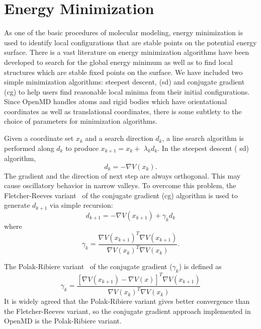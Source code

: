 \documentclass[]{book}
\begin{document}
\chapter{\label{section:minimizer}Energy Minimization}

As one of the basic procedures of molecular modeling, energy
minimization is used to identify local configurations that are stable
points on the potential energy surface. There is a vast literature on
energy minimization algorithms have been developed to search for the
global energy minimum as well as to find local structures which are
stable fixed points on the surface.  We have included two simple
minimization algorithms: steepest descent, ({\sc sd}) and conjugate
gradient ({\sc cg}) to help users find reasonable local minima from
their initial configurations. Since {\sc OpenMD} handles atoms and
rigid bodies which have orientational coordinates as well as
translational coordinates, there is some subtlety to the choice of
parameters for minimization algorithms.

Given a coordinate set $x_{k}$ and a search direction $d_{k}$, a line
search algorithm is performed along $d_{k}$ to produce
$x_{k+1}=x_{k}+$ $\lambda _{k}d_{k}$. In the steepest descent ({\sc
sd}) algorithm,%
\begin{equation}
d_{k}=-\nabla V(x_{k}).
\end{equation}
The gradient and the direction of next step are always orthogonal.
This may cause oscillatory behavior in narrow valleys.  To overcome
this problem, the Fletcher-Reeves variant~\cite{FletcherReeves} of the
conjugate gradient ({\sc cg}) algorithm is used to generate $d_{k+1}$
via simple recursion:
\begin{equation}
d_{k+1}  =-\nabla V(x_{k+1})+\gamma_{k}d_{k}
\end{equation}
where
\begin{equation}
\gamma_{k}  =\frac{\nabla V(x_{k+1})^{T}\nabla V(x_{k+1})}{\nabla
V(x_{k})^{T}\nabla V(x_{k})}.
\end{equation}

The Polak-Ribiere variant~\cite{PolakRibiere} of the conjugate
gradient ($\gamma_{k}$) is defined as%
\begin{equation}
\gamma_{k}=\frac{[\nabla V(x_{k+1})-\nabla V(x)]^{T}\nabla V(x_{k+1})}{\nabla
V(x_{k})^{T}\nabla V(x_{k})}%
\end{equation}
It is widely agreed that the Polak-Ribiere variant gives better
convergence than the Fletcher-Reeves variant, so the conjugate
gradient approach implemented in {\sc OpenMD} is the Polak-Ribiere
variant.
\end{document}
